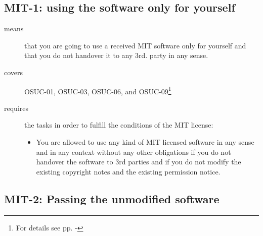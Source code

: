 \begin{center}
\begin{footnotesize}
{{{{{        }


      }
 
    }
   }   
}
\end{footnotesize}
\end{center}

\subsection{MIT-1: using the software only for yourself}
\label{OSUC-01-MIT} 
\label{OSUC-03-MIT} 
\label{OSUC-06-MIT}
\label{OSUC-09-MIT}
  
\begin{description}
\item[means] that you are going to use a received MIT software only for yourself
and that you do not handover it to any 3rd. party in any sense.
\item[covers] OSUC-01, OSUC-03, OSUC-06, and OSUC-09\footnote{For details see pp.
  \pageref{OSUC-01-DEF} - \pageref{OSUC-09-DEF}}
\item[requires] the tasks in order to fulfill the conditions
    of the MIT license:
  \begin{itemize}
    \item You are allowed to use any kind of MIT licensed software in any sense
    and in any context without any other obligations if you do not handover the
    software to 3rd parties and if you do not modify the existing copyright
    notes and the existing permission notice.
  \end{itemize}
\end{description}

\subsection{MIT-2: Passing the unmodified software}
\label{OSUC-02-MIT} \label{OSUC-05-MIT} \label{OSUC-07-MIT} 

